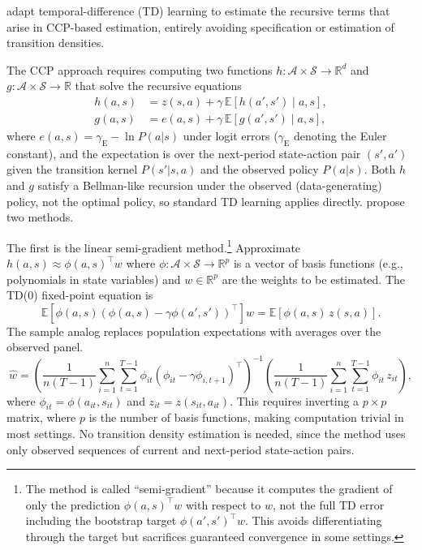 \citet{AdusumilliEckardt2022} adapt temporal-difference (TD) learning to estimate the recursive terms that arise in CCP-based estimation, entirely avoiding specification or estimation of transition densities.

The CCP approach requires computing two functions $h: \mathcal{A} \times \mathcal{S} \to \mathbb{R}^d$ and $g: \mathcal{A} \times \mathcal{S} \to \mathbb{R}$ that solve the recursive equations
\begin{align}
h(a,s) &= z(s,a) + \gamma \, \mathbb{E}[h(a', s') \mid a, s], \label{eq:ae_h}\\
g(a,s) &= e(a,s) + \gamma \, \mathbb{E}[g(a', s') \mid a, s], \label{eq:ae_g}
\end{align}
where $e(a,s) = \gamma_{\text{E}} - \ln P(a|s)$ under logit errors ($\gamma_{\text{E}}$ denoting the Euler constant), and the expectation is over the next-period state-action pair $(s', a')$ given the transition kernel $P(s'|s,a)$ and the observed policy $P(a|s)$. Both $h$ and $g$ satisfy a Bellman-like recursion under the observed (data-generating) policy, not the optimal policy, so standard TD learning applies directly. \citet{AdusumilliEckardt2022} propose two methods.

The first is the linear semi-gradient method.\footnote{The method is called ``semi-gradient'' because it computes the gradient of only the prediction $\phi(a,s)^\top w$ with respect to $w$, not the full TD error including the bootstrap target $\phi(a',s')^\top w$. This avoids differentiating through the target but sacrifices guaranteed convergence in some settings.} Approximate $h(a,s) \approx \phi(a,s)^\top w$ where $\phi: \mathcal{A} \times \mathcal{S} \to \mathbb{R}^p$ is a vector of basis functions (e.g., polynomials in state variables) and $w \in \mathbb{R}^p$ are the weights to be estimated. The TD(0) fixed-point equation is
\begin{equation}
\mathbb{E}\left[\phi(a,s)\left(\phi(a,s) - \gamma \phi(a', s')\right)^\top\right] w = \mathbb{E}\left[\phi(a,s) \, z(s,a)\right]. \label{eq:ae_semigradient}
\end{equation}
The sample analog replaces population expectations with averages over the observed panel.
\begin{equation}
\hat{w} = \left(\frac{1}{n(T-1)} \sum_{i=1}^n \sum_{t=1}^{T-1} \phi_{it}\left(\phi_{it} - \gamma \phi_{i,t+1}\right)^\top\right)^{-1} \left(\frac{1}{n(T-1)} \sum_{i=1}^n \sum_{t=1}^{T-1} \phi_{it} \, z_{it}\right),
\end{equation}
where $\phi_{it} = \phi(a_{it}, s_{it})$ and $z_{it} = z(s_{it}, a_{it})$. This requires inverting a $p \times p$ matrix, where $p$ is the number of basis functions, making computation trivial in most settings. No transition density estimation is needed, since the method uses only observed sequences of current and next-period state-action pairs.


